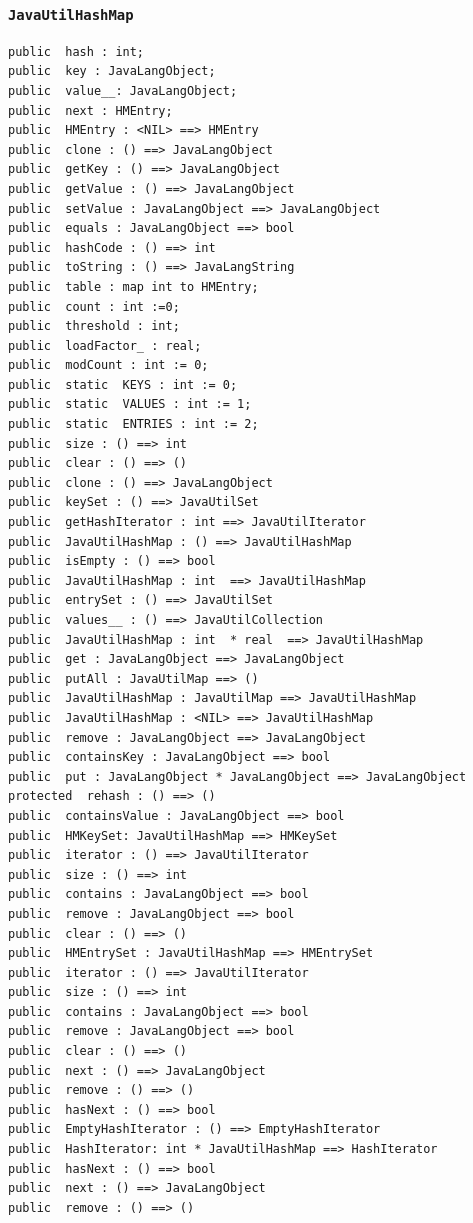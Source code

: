 \documentclass[\pformat,12pt]{article}
\begin{document}
\subsubsection{\texttt{JavaUtilHashMap}}
\begin{small}
\begin{verbatim}
public  hash : int;
public  key : JavaLangObject;
public  value__: JavaLangObject;
public  next : HMEntry;
public  HMEntry : <NIL> ==> HMEntry
public  clone : () ==> JavaLangObject
public  getKey : () ==> JavaLangObject
public  getValue : () ==> JavaLangObject
public  setValue : JavaLangObject ==> JavaLangObject
public  equals : JavaLangObject ==> bool
public  hashCode : () ==> int
public  toString : () ==> JavaLangString
public  table : map int to HMEntry;
public  count : int :=0;
public  threshold : int;
public  loadFactor_ : real;
public  modCount : int := 0;
public  static  KEYS : int := 0;
public  static  VALUES : int := 1;
public  static  ENTRIES : int := 2;
public  size : () ==> int
public  clear : () ==> ()
public  clone : () ==> JavaLangObject
public  keySet : () ==> JavaUtilSet
public  getHashIterator : int ==> JavaUtilIterator
public  JavaUtilHashMap : () ==> JavaUtilHashMap
public  isEmpty : () ==> bool
public  JavaUtilHashMap : int  ==> JavaUtilHashMap
public  entrySet : () ==> JavaUtilSet
public  values__ : () ==> JavaUtilCollection
public  JavaUtilHashMap : int  * real  ==> JavaUtilHashMap
public  get : JavaLangObject ==> JavaLangObject
public  putAll : JavaUtilMap ==> ()
public  JavaUtilHashMap : JavaUtilMap ==> JavaUtilHashMap
public  JavaUtilHashMap : <NIL> ==> JavaUtilHashMap
public  remove : JavaLangObject ==> JavaLangObject
public  containsKey : JavaLangObject ==> bool
public  put : JavaLangObject * JavaLangObject ==> JavaLangObject
protected  rehash : () ==> ()
public  containsValue : JavaLangObject ==> bool
public  HMKeySet: JavaUtilHashMap ==> HMKeySet
public  iterator : () ==> JavaUtilIterator
public  size : () ==> int
public  contains : JavaLangObject ==> bool
public  remove : JavaLangObject ==> bool
public  clear : () ==> ()
public  HMEntrySet : JavaUtilHashMap ==> HMEntrySet
public  iterator : () ==> JavaUtilIterator
public  size : () ==> int
public  contains : JavaLangObject ==> bool
public  remove : JavaLangObject ==> bool
public  clear : () ==> ()
public  next : () ==> JavaLangObject
public  remove : () ==> ()
public  hasNext : () ==> bool
public  EmptyHashIterator : () ==> EmptyHashIterator
public  HashIterator: int * JavaUtilHashMap ==> HashIterator
public  hasNext : () ==> bool
public  next : () ==> JavaLangObject
public  remove : () ==> ()
\end{verbatim}
\end{small}
\end{document}
